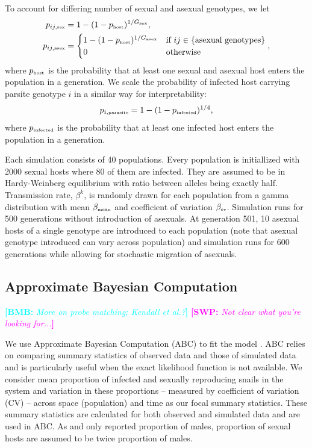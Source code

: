 \documentclass{article}\usepackage[]{graphicx}\usepackage[]{color}
\newcommand{\comment}[3]{\textcolor{#1}{\textbf{[#2: }\textit{#3}\textbf{]}}}
\newcommand{\bmb}[1]{\comment{cyan}{BMB}{#1}}
\newcommand{\swp}[1]{\comment{magenta}{SWP}{#1}}
\begin{document}
To account for differing number of sexual and asexual genotypes, we let 
\begin{equation}
\begin{aligned}
p_{ij, \textrm{\tiny sex}} &= 1-(1-p_{\textrm{\tiny host}})^{1/G_\textrm{\tiny sex}},\\
p_{ij, \textrm{\tiny asex}} &=
\begin{cases}
1-(1-p_{\textrm{\tiny host}})^{1/G_\textrm{\tiny asex}} & \text{if } ij \in \{\text{asexual genotypes}\} \\
0 & \text{otherwise}
\end{cases},
\end{aligned}
\end{equation}
where $p_{\textrm{\tiny host}}$ is the probability that at least one sexual and asexual host enters the population in a generation. We scale the probability of infected host carrying parsite genotype $i$ in a similar way for interpretability:
\begin{equation}
p_{i, \textrm{\tiny parasite}} = 1 - (1-p_{\textrm{\tiny infected}})^{1/4},
\end{equation}
where $p_{\textrm{\tiny infected}}$ is the probability that at least one infected host enters the population in a generation.

Each simulation consists of 40 populations. Every population is initiallized with 2000 sexual hosts where 80 of them are infected. They are assumed to be in Hardy-Weinberg equilibrium with ratio between alleles being exactly half. 
Transmission rate, $\beta^k$, is randomly drawn for each population from a gamma distribution with mean $\beta_{\textrm{\tiny mean}}$ and coefficient of variation $\beta_{\textrm{\tiny cv}}$. 
Simulation runs for 500 generations without introduction of asexuals. At generation 501, 10 asexual hosts of a single genotype are introduced to each population (note that asexual genotype introduced can vary across population) and simulation runs for 600 generations while allowing for stochastic migration of asexuals.

\subsection{Approximate Bayesian Computation}

\bmb{More on probe matching; Kendall et al.?}
\swp{Not clear what you're looking for...}

We use Approximate Bayesian Computation (ABC) to fit the model \citep{toni2009approximate}.
ABC relies on comparing summary statistics of observed data and those of simulated data and is particularly useful when the exact likelihood function is not available.
We consider mean proportion of infected and sexually reproducing snails in the system and variation in these proportions -- measured by coefficient of variation (CV) -- across space (population) and time as our focal summary statistics.
These summary statistics are calculated for both observed and simulated data and are used in ABC.
As \cite{dagan2013clonal} and \cite{mckone2016fine} only reported proportion of males, proportion of sexual hosts are assumed to be twice proportion of males.
\end{document}
